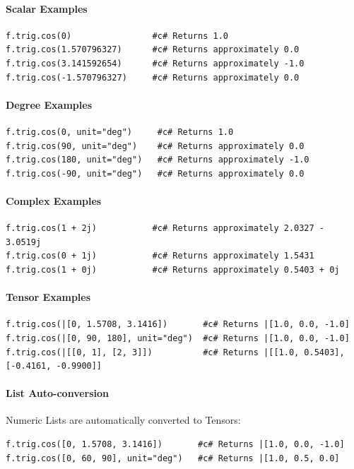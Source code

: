 \paragraph{Scalar Examples}
\begin{verbatim}
f.trig.cos(0)                #c# Returns 1.0
f.trig.cos(1.570796327)      #c# Returns approximately 0.0
f.trig.cos(3.141592654)      #c# Returns approximately -1.0
f.trig.cos(-1.570796327)     #c# Returns approximately 0.0
\end{verbatim}

\paragraph{Degree Examples}
\begin{verbatim}
f.trig.cos(0, unit="deg")     #c# Returns 1.0
f.trig.cos(90, unit="deg")    #c# Returns approximately 0.0
f.trig.cos(180, unit="deg")   #c# Returns approximately -1.0
f.trig.cos(-90, unit="deg")   #c# Returns approximately 0.0
\end{verbatim}

\paragraph{Complex Examples}
\begin{verbatim}
f.trig.cos(1 + 2j)           #c# Returns approximately 2.0327 - 3.0519j
f.trig.cos(0 + 1j)           #c# Returns approximately 1.5431
f.trig.cos(1 + 0j)           #c# Returns approximately 0.5403 + 0j
\end{verbatim}

\paragraph{Tensor Examples}
\begin{verbatim}
f.trig.cos(|[0, 1.5708, 3.1416])       #c# Returns |[1.0, 0.0, -1.0]
f.trig.cos(|[0, 90, 180], unit="deg")  #c# Returns |[1.0, 0.0, -1.0]
f.trig.cos(|[[0, 1], [2, 3]])          #c# Returns |[[1.0, 0.5403], [-0.4161, -0.9900]]
\end{verbatim}

\paragraph{List Auto-conversion}
Numeric Lists are automatically converted to Tensors:
\begin{verbatim}
f.trig.cos([0, 1.5708, 3.1416])       #c# Returns |[1.0, 0.0, -1.0]
f.trig.cos([0, 60, 90], unit="deg")   #c# Returns |[1.0, 0.5, 0.0]
\end{verbatim}

